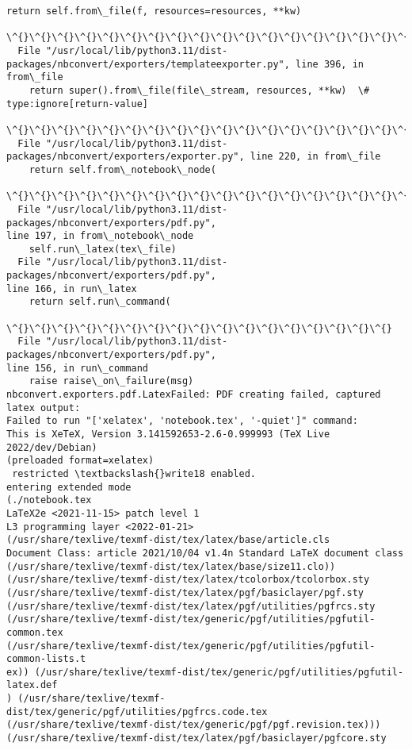 \documentclass[11pt]{article}
\begin{document}
\begin{Verbatim}[commandchars=\\\{\}]
    return self.from\_file(f, resources=resources, **kw)
           \^{}\^{}\^{}\^{}\^{}\^{}\^{}\^{}\^{}\^{}\^{}\^{}\^{}\^{}\^{}\^{}\^{}\^{}\^{}\^{}\^{}\^{}\^{}\^{}\^{}\^{}\^{}\^{}\^{}\^{}\^{}\^{}\^{}\^{}\^{}\^{}\^{}\^{}\^{}\^{}\^{}\^{}\^{}\^{}
  File "/usr/local/lib/python3.11/dist-
packages/nbconvert/exporters/templateexporter.py", line 396, in from\_file
    return super().from\_file(file\_stream, resources, **kw)  \#
type:ignore[return-value]
           \^{}\^{}\^{}\^{}\^{}\^{}\^{}\^{}\^{}\^{}\^{}\^{}\^{}\^{}\^{}\^{}\^{}\^{}\^{}\^{}\^{}\^{}\^{}\^{}\^{}\^{}\^{}\^{}\^{}\^{}\^{}\^{}\^{}\^{}\^{}\^{}\^{}\^{}\^{}\^{}\^{}\^{}\^{}\^{}\^{}\^{}\^{}
  File "/usr/local/lib/python3.11/dist-
packages/nbconvert/exporters/exporter.py", line 220, in from\_file
    return self.from\_notebook\_node(
           \^{}\^{}\^{}\^{}\^{}\^{}\^{}\^{}\^{}\^{}\^{}\^{}\^{}\^{}\^{}\^{}\^{}\^{}\^{}\^{}\^{}\^{}\^{}\^{}
  File "/usr/local/lib/python3.11/dist-packages/nbconvert/exporters/pdf.py",
line 197, in from\_notebook\_node
    self.run\_latex(tex\_file)
  File "/usr/local/lib/python3.11/dist-packages/nbconvert/exporters/pdf.py",
line 166, in run\_latex
    return self.run\_command(
           \^{}\^{}\^{}\^{}\^{}\^{}\^{}\^{}\^{}\^{}\^{}\^{}\^{}\^{}\^{}\^{}\^{}
  File "/usr/local/lib/python3.11/dist-packages/nbconvert/exporters/pdf.py",
line 156, in run\_command
    raise raise\_on\_failure(msg)
nbconvert.exporters.pdf.LatexFailed: PDF creating failed, captured latex output:
Failed to run "['xelatex', 'notebook.tex', '-quiet']" command:
This is XeTeX, Version 3.141592653-2.6-0.999993 (TeX Live 2022/dev/Debian)
(preloaded format=xelatex)
 restricted \textbackslash{}write18 enabled.
entering extended mode
(./notebook.tex
LaTeX2e <2021-11-15> patch level 1
L3 programming layer <2022-01-21>
(/usr/share/texlive/texmf-dist/tex/latex/base/article.cls
Document Class: article 2021/10/04 v1.4n Standard LaTeX document class
(/usr/share/texlive/texmf-dist/tex/latex/base/size11.clo))
(/usr/share/texlive/texmf-dist/tex/latex/tcolorbox/tcolorbox.sty
(/usr/share/texlive/texmf-dist/tex/latex/pgf/basiclayer/pgf.sty
(/usr/share/texlive/texmf-dist/tex/latex/pgf/utilities/pgfrcs.sty
(/usr/share/texlive/texmf-dist/tex/generic/pgf/utilities/pgfutil-common.tex
(/usr/share/texlive/texmf-dist/tex/generic/pgf/utilities/pgfutil-common-lists.t
ex)) (/usr/share/texlive/texmf-dist/tex/generic/pgf/utilities/pgfutil-latex.def
) (/usr/share/texlive/texmf-dist/tex/generic/pgf/utilities/pgfrcs.code.tex
(/usr/share/texlive/texmf-dist/tex/generic/pgf/pgf.revision.tex)))
(/usr/share/texlive/texmf-dist/tex/latex/pgf/basiclayer/pgfcore.sty

\end{Verbatim}
\end{document}

